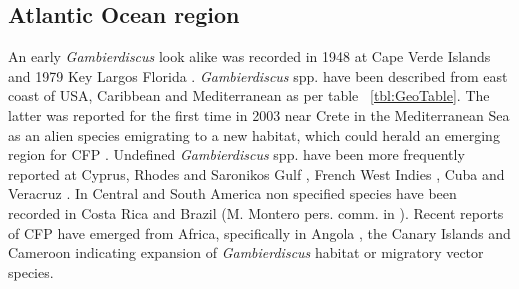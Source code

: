\documentclass[12pt]{article}
\begin{document}
\subsection{Atlantic Ocean region}
An early \emph{Gambierdiscus} look alike was recorded in 1948 at Cape Verde Islands \cite{silva1956contribution} and 1979 Key Largos Florida \cite{taylor1979description}.
\emph{Gambierdiscus} spp. have been described from east coast of USA, Caribbean and Mediterranean as per table ~\ref{tbl:GeoTable}. The latter was reported for the first time in 2003 near Crete in the Mediterranean Sea as an alien species emigrating to a new habitat, which could herald an emerging region for CFP \cite{aligizaki2008morphological,zenetos2009aquatic}.
Undefined \emph{Gambierdiscus} spp. have been more frequently reported at Cyprus, Rhodes and Saronikos Gulf \cite{aligizaki2009toxic,aligizaki2010diversity}, French West Indies \cite{lobel1988assessment}, Cuba \cite{delgado2006epiphytic} and Veracruz \cite{okolodkov2007seasonal}.
In Central and South America non specified species have been recorded in Costa Rica and Brazil (M. Montero pers. comm. in \cite{parsons2012gambierdiscus}).
Recent reports of CFP have emerged from Africa, specifically in Angola \cite{berdalet2012global}, the Canary Islands \cite{boada2010ciguatera} and Cameroon \cite{bienfang2008ciguatera} indicating expansion of \emph{Gambierdiscus} habitat or migratory vector species. %
\end{document}
